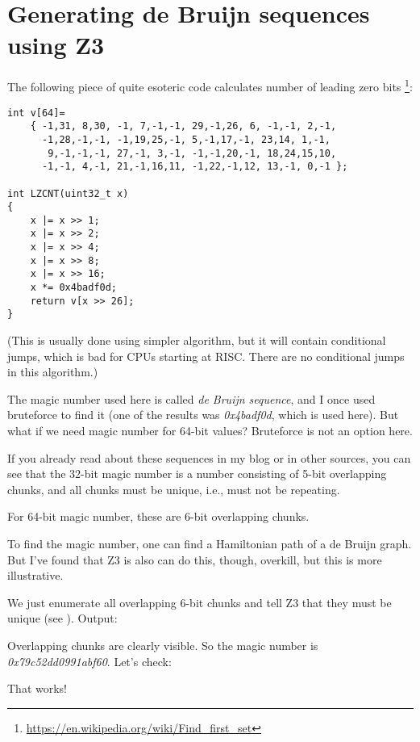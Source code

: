 \section{Generating de Bruijn sequences using Z3}
\label{DeBruijnZ3}

\renewcommand{\CURPATH}{equations/de_bruijn_SMT}

The following piece of quite esoteric code calculates number of leading zero bits
\footnote{\url{https://en.wikipedia.org/wiki/Find_first_set}}:

\begin{lstlisting}
int v[64]=
	{ -1,31, 8,30, -1, 7,-1,-1, 29,-1,26, 6, -1,-1, 2,-1,
	  -1,28,-1,-1, -1,19,25,-1, 5,-1,17,-1, 23,14, 1,-1,
	   9,-1,-1,-1, 27,-1, 3,-1, -1,-1,20,-1, 18,24,15,10,
	  -1,-1, 4,-1, 21,-1,16,11, -1,22,-1,12, 13,-1, 0,-1 };

int LZCNT(uint32_t x)
{
    x |= x >> 1;
    x |= x >> 2;
    x |= x >> 4;
    x |= x >> 8;
    x |= x >> 16;
    x *= 0x4badf0d;
    return v[x >> 26];
}
\end{lstlisting}

(This is usually done using simpler algorithm, but it will contain conditional jumps, which is bad for
CPUs starting at RISC. There are no conditional jumps in this algorithm.)

The magic number used here is called \textit{de Bruijn sequence},
and I once used bruteforce to find it (one of the results was \textit{0x4badf0d}, which is used here).
But what if we need magic number for 64-bit values?
Bruteforce is not an option here.

If you already read about these sequences in my blog or in other sources,
you can see that the 32-bit magic number is a number consisting
of 5-bit overlapping chunks, and all chunks must be unique, i.e., must not be repeating.

For 64-bit magic number, these are 6-bit overlapping chunks.

To find the magic number, one can find a Hamiltonian path of a de Bruijn graph.
But I've found that Z3 is also can do this, though, overkill, but this is more illustrative.



We just enumerate all overlapping 6-bit chunks and tell Z3 that they must be unique (see ).
Output:



Overlapping chunks are clearly visible.
So the magic number is \textit{0x79c52dd0991abf60}.
Let's check:



That works!

